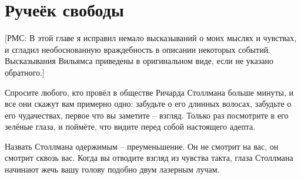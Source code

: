 

\chapter{Ручеёк свободы}

[РМС: В этой главе я исправил немало высказываний о моих мыслях и чувствах, и сгладил необоснованную враждебность в описании некоторых событий. Высказывания Вильямса приведены в оригинальном виде, если не указано обратного.]

Спросите любого, кто провёл в обществе Ричарда Столлмана больше минуты, и все они скажут вам примерно одно: забудьте о его длинных волосах, забудьте о его чудачествах, первое что вы заметите -- взгляд. Только раз посмотрите в его зелёные глаза, и поймёте, что видите перед собой настоящего адепта.

Назвать Столлмана одержимым -- преуменьшение. Он не смотрит на вас, он смотрит сквозь вас. Когда вы отводите взгляд из чувства такта, глаза Столлмана начинают жечь вашу голову подобно двум лазерным лучам.

